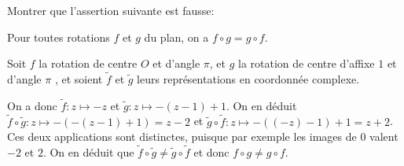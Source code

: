 \begin{exo}
Montrer que l'assertion suivante est fausse:
\begin{center}
\og Pour toutes rotations $f$ et $g$ du plan, on a $f\circ g = g\circ f$.\fg
\end{center}
\begin{sol}
Soit $f$ la rotation de centre $O$ et d'angle $\pi$, et $g$ la rotation de centre d'affixe $1$ et d'angle $\pi$ , et soient $\tilde f$ et $\tilde g$ leurs représentations en coordonnée complexe.

 On a donc $\tilde f : z\mapsto -z$ et $\tilde g : z\mapsto -(z-1)+1$.
 On en déduit $\tilde f\circ \tilde g : z\mapsto -(-(z-1)+1) = z-2$ et 
 $\tilde g\circ \tilde f : z\mapsto -((-z)-1)+1 = z+2$. Ces deux applications sont distinctes, puisque par exemple les images de $0$ valent $-2$ et $2$. On en déduit que $\tilde f\circ \tilde g \neq \tilde g\circ \tilde f$ et donc $f\circ g \neq g\circ f$.
\end{sol}
\end{exo}






